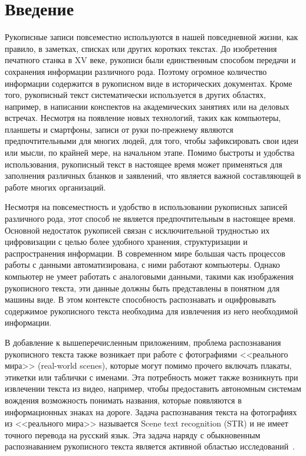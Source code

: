 \section{Введение}
\label{sec:Chapter0} 

Рукописные записи повсеместно используются в нашей повседневной жизни, как правило, в заметках, списках или других коротких текстах.
До изобретения печатного станка в XV веке, рукописи были единственным способом передачи и сохранения информации различного рода.
Поэтому огромное количество информации содержится в рукописном виде в исторических документах.
Кроме того, рукописный текст систематически используется в других областях, например, в написании конспектов на академических занятиях или на деловых встречах.
Несмотря на появление новых технологий, таких как компьютеры, планшеты и смартфоны, записи от руки по-прежнему являются предпочтительными для многих людей,
для того, чтобы зафиксировать свои идеи или мысли, по крайней мере, на начальном этапе.
Помимо быстроты и удобства использования, рукописный текст в настоящее время может применяться для заполнения различных бланков и заявлений,
что является важной составляющей в работе многих организаций.

Несмотря на повсеместность и удобство в использовании рукописных записей различного рода, этот способ не является предпочтительным в настоящее время.
Основной недостаток рукописей связан с исключительной трудностью их цифровизации с целью более удобного хранения, структуризации и распространения информации.
В современном мире большая часть процессов работы с данными автоматизирована, с ними работают компьютеры.
Однако компьютер не умеет работать с аналоговыми данными, такими как изображения рукописного текста, эти данные должны быть представлены в понятном для машины виде.
В этом контексте способность распознавать и оцифровывать содержимое рукописного текста необходима для извлечения из него необходимой информации.

В добавление к вышеперечисленным приложениям, проблема распознавания рукописного текста также возникает при работе
с фотографиями <<реального мира>> (real-world scenes), которые могут помимо прочего включать плакаты, этикетки или таблички с именами.
Эта потребность может также возникнуть при извлечении текста из видео, например, чтобы предоставить автономным системам вождения возможность понимать названия,
которые появляются в информационных знаках на дороге.
Задача распознавания текста на фотографиях из <<реального мира>> называется Scene text recognition (STR) и не имеет точного перевода на русский язык.
Эта задача наряду с обыкновенным распознаванием рукописного текста является активной областью исследований~\cite{zhu2016scene}.

